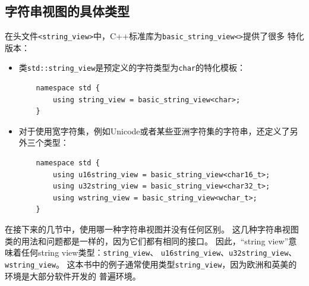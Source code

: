\subsection{字符串视图的具体类型}
在头文件\texttt{<string\_view>}中，C++标准库为\texttt{basic\_string\_view<>}提供了很多
特化版本：
\begin{itemize}
    \item 类\texttt{std::string\_view}是预定义的字符类型为\texttt{char}的特化模板：
    \begin{lstlisting}
    namespace std {
        using string_view = basic_string_view<char>;
    }
    \end{lstlisting}
    \item 对于使用宽字符集，例如Unicode或者某些亚洲字符集的字符串，还定义了另外三个类型：
    \begin{lstlisting}
    namespace std {
        using u16string_view = basic_string_view<char16_t>;
        using u32string_view = basic_string_view<char32_t>;
        using wstring_view = basic_string_view<wchar_t>;
    }
    \end{lstlisting}
\end{itemize}
在接下来的几节中，使用哪一种字符串视图并没有任何区别。
这几种字符串视图类的用法和问题都是一样的，因为它们都有相同的接口。
因此，“string view”意味着任何string view类型：\texttt{string\_view}、
\texttt{u16string\_view}、\texttt{u32string\_view}、\texttt{wstring\_view}。
这本书中的例子通常使用类型\texttt{string\_view}，因为欧洲和英美的环境是大部分软件开发的
普遍环境。

